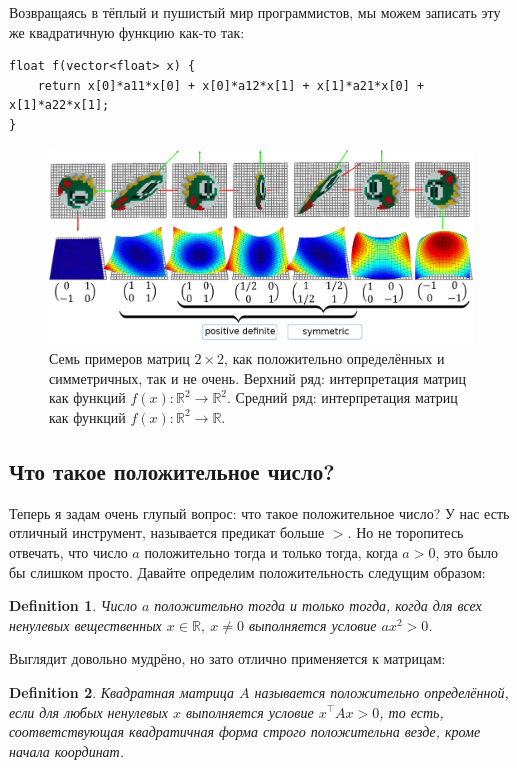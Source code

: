 \documentclass[notitlepage]{report}
\newtheorem{definition}{Definition}
\begin{document}
Возвращаясь в тёплый и пушистый мир программистов, мы можем записать эту же квадратичную функцию как-то так:
\begin{verbatim}
float f(vector<float> x) {
    return x[0]*a11*x[0] + x[0]*a12*x[1] + x[1]*a21*x[0] + x[1]*a22*x[1];
}
\end{verbatim}

\begin{figure}[ht]
	\centering
	\includegraphics[width=\linewidth]{matrices}
	\caption{Семь примеров матриц $2\times 2$, как положительно определённых и симметричных, так и не очень. Верхний ряд: интерпретация матриц как функций $f(x):\mathbb R^2 \rightarrow \mathbb R^2$. Средний ряд: интерпретация матриц как функций $f(x):\mathbb R^2 \rightarrow \mathbb R$.}
	\label{fig:matrices}
\end{figure}


\subsection{Что такое положительное число?}
Теперь я задам очень глупый вопрос: что такое положительное число?
У нас есть отличный инструмент, называется предикат больше $>$.
Но не торопитесь отвечать, что число $a$ положительно тогда и только тогда, когда $a>0$, это было бы слишком просто. Давайте определим положительность следущим образом:
\begin{definition}
Число $a$ положительно тогда и только тогда, когда для всех ненулевых вещественных $x\in\mathbb R,\ x\neq 0$ выполняется условие $ax^2>0$.
\end{definition}

Выглядит довольно мудрёно, но зато отлично применяется к матрицам:

\begin{definition}
Квадратная матрица $A$ называется положительно определённой, если для любых ненулевых $x$
выполняется условие $x^\top A x > 0$, то есть, соответствующая квадратичная форма строго положительна везде, кроме начала координат.
\end{definition}
\end{document}
